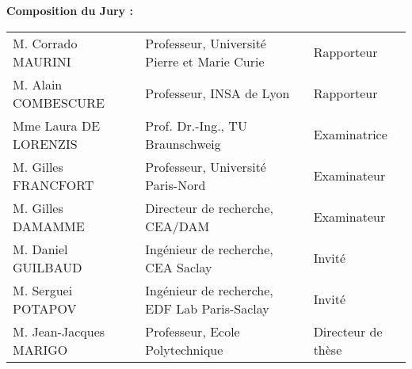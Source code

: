\begin{titlepage}
\begin{mdframed}
\begin{flushleft}
\textbf{Composition du Jury :}

\vspace{15pt}
\begin{tabular}{@{}lll}
M. Corrado MAURINI & Professeur, Université Pierre et Marie Curie & Rapporteur \\
M. Alain COMBESCURE & Professeur, INSA de Lyon & Rapporteur \\
Mme Laura DE LORENZIS & Prof. Dr.-Ing., TU Braunschweig & Examinatrice \\
M. Gilles FRANCFORT & Professeur, Université Paris-Nord & Examinateur \\
M. Gilles DAMAMME & Directeur de recherche, CEA/DAM & Examinateur \\
M. Daniel GUILBAUD & Ingénieur de recherche, CEA Saclay & Invité \\
M. Serguei POTAPOV & Ingénieur de recherche, EDF Lab Paris-Saclay & Invité \\
M. Jean-Jacques MARIGO & Professeur, Ecole Polytechnique & Directeur de thèse
\end{tabular}
\end{flushleft}
\end{mdframed}
\end{titlepage}

\titlepage
\setcounter{page}{3}
\restoregeometry